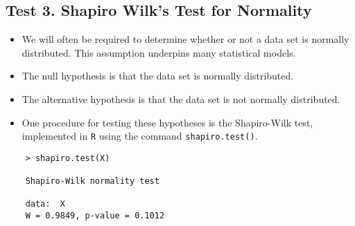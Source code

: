 \documentclass[]{report}
\begin{document}
\subsection*{Test 3. Shapiro Wilk's Test for Normality}
\begin{itemize}
	\item We will often be required to determine whether or not a data set is normally distributed.
	This assumption underpins many statistical models.
	\item The null hypothesis is that the data set is normally distributed.
	\item The alternative hypothesis is that the data set is not normally distributed.
	\item One procedure for testing these hypotheses is the Shapiro-Wilk test, implemented in \texttt{R} using the command \texttt{shapiro.test()}.
\end{itemize}
\begin{framed}
	\begin{verbatim}
	> shapiro.test(X)
	
	Shapiro-Wilk normality test
	
	data:  X
	W = 0.9849, p-value = 0.1012
	
	
	\end{verbatim}
\end{framed}
\end{document}

